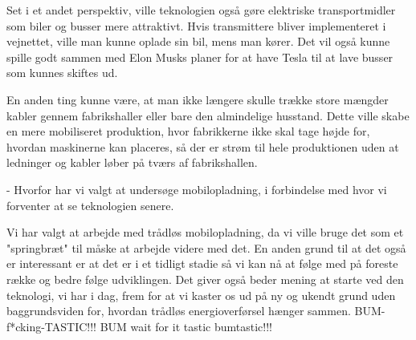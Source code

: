 Set i et andet perspektiv, ville teknologien også gøre elektriske transportmidler som biler og busser mere attraktivt. Hvis transmittere bliver implementeret i vejnettet, ville man kunne oplade sin bil, mens man kører. Det vil også kunne spille godt sammen med Elon Musks planer for at have Tesla til at lave busser som kunnes skiftes ud.

En anden ting kunne være, at man ikke længere skulle trække store mængder kabler gennem fabrikshaller eller bare den almindelige husstand. Dette ville skabe en mere mobiliseret produktion, hvor fabrikkerne ikke skal tage højde for, hvordan maskinerne kan placeres, så der er strøm til hele produktionen uden at ledninger og kabler løber på tværs af fabrikshallen.

 - Hvorfor har vi valgt at undersøge mobilopladning, i forbindelse med hvor vi forventer at se teknologien senere.
 
Vi har valgt at arbejde med trådløs mobilopladning, da vi ville bruge det som et "springbræt" til måske at arbejde videre med det. En anden grund til at det også er interessant er at det er i et tidligt stadie så vi kan nå at følge med på foreste række og bedre følge udviklingen. Det giver også beder mening at starte ved den teknologi, vi har i dag, frem for at vi kaster os ud på ny og ukendt grund uden baggrundsviden for, hvordan trådløs energioverførsel hænger sammen. BUM-f*cking-TASTIC!!! BUM wait for it tastic bumtastic!!!